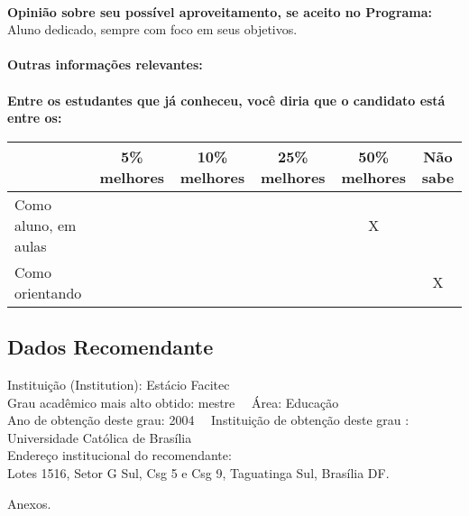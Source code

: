 \documentclass[11pt]{article}
\begin{document}
\\
\textbf{Opinião sobre seu possível aproveitamento, se aceito no Programa:}
\\Aluno dedicado, sempre com foco em seus objetivos. \\ 
\\
\textbf{Outras informações relevantes:} \\
\\[0.3cm]
\textbf{Entre os estudantes que já conheceu, você diria que o candidato está entre os:}
\\
\begin{tabular}{|l|c|c|c|c|c|}
\hline
 & 5\% melhores & 10\% melhores & 25\% melhores & 50\% melhores & Não sabe \\
\hline
Como aluno, em aulas &  &  &  & X & \\
\hline
Como orientando &  &  &  &  & X\\
\hline
\end{tabular}
\subsection*{Dados Recomendante} 
	Instituição (Institution): Estácio Facitec
\\ 
	Grau acadêmico mais alto obtido: mestre
	\ \ Área: Educação
	\\
	Ano de obtenção deste grau: 2004
	\ \ 
	Instituição de obtenção deste grau : Universidade Católica de Brasília
	\\ 
	Endereço institucional do recomendante: \\ Lotes 1516, Setor G Sul, Csg 5 e Csg 9, Taguatinga Sul, Brasília DF.  
\begin{center}
Anexos.
\end{center}
\end{document}
